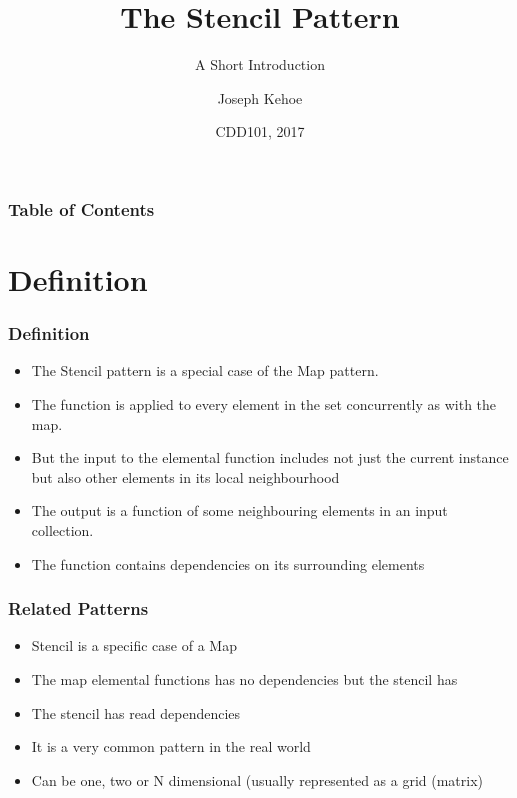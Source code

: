 \documentclass{beamer}
\title[The Stencil Pattern] %
{The Stencil Pattern}
\subtitle{A Short Introduction}
\author[Dr. Joseph Kehoe] %
{Joseph Kehoe\inst{1}}
\institute[IT Carlow] %
{
	\inst{1}%
	Department of Computing and Networking\\
	Institute of Technology Carlow
}
\date[ITC 2017] %
{CDD101, 2017}
\begin{document}
 
\frame{\titlepage}
 
 
 
 \begin{frame}
 	\frametitle{Table of Contents}
 	\tableofcontents
 \end{frame}
 
 
 \section{Definition}
\begin{frame}
\frametitle{Definition}

\begin{itemize}
	\item The Stencil pattern is a special case of the Map pattern.
	\item The function is applied to every element in the set concurrently as with the map.
	\item But the input to the elemental function includes not just the current instance but also other elements in its local neighbourhood
	\item The output is a function of some neighbouring elements in an input collection.
	\item The function contains dependencies on its surrounding elements
\end{itemize}
\end{frame}

\begin{frame}
	\frametitle{Related Patterns}
\begin{itemize}
\item Stencil is a specific case of a Map

\item The map elemental functions has no dependencies but the stencil has

\item The stencil has read dependencies

\item It is a very common pattern in the real world

\item Can be one, two or N dimensional (usually represented as a grid (matrix)
\end{itemize}
\end{frame}
\end{document}
